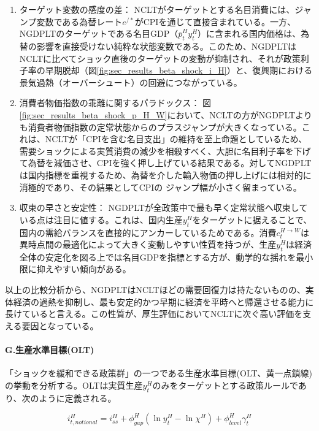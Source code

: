 \begin{enumerate}
    \item\label{itm:sec_results_beta_shock_analysis_ngdplt_sensitivity} ターゲット変数の感度の差：
    NCLTがターゲットとする名目消費には、ジャンプ変数である為替レート\(e^{/*}\)がCPIを通じて直接含まれている。一方、NGDPLTのターゲットである名目GDP（\(\bar{p}_t^Hy_t^H\)）に含まれる国内価格は、為替の影響を直接受けない純粋な状態変数である。このため、NGDPLTはNCLTに比べてショック直後のターゲットの変動が抑制され、それが政策利子率の早期脱却（図\ref{fig:sec_results_beta_shock_i_H}）と、復興期における景気過熱（オーバーシュート）の回避につながっている。
    \item\label{itm:sec_results_beta_shock_analysis_ngdplt_cpi} 消費者物価指数の乖離に関するパラドックス：
    図\ref{fig:sec_results_beta_shock_p_H_W}において、NCLTの方がNGDPLTよりも消費者物価指数の定常状態からのプラスジャンプが大きくなっている。これは、NCLTが「CPIを含む名目支出」の維持を至上命題としているため、需要ショックによる実質消費の減少を相殺すべく、大胆に名目利子率を下げて為替を減価させ、CPIを強く押し上げている結果である。対してNGDPLTは国内指標を重視するため、為替を介した輸入物価の押し上げには相対的に消極的であり、その結果としてCPIの ジャンプ幅が小さく留まっている。
    \item\label{itm:sec_results_beta_shock_analysis_ngdplt_convergence} 収束の早さと安定性：
    NGDPLTが全政策中で最も早く定常状態へ収束している点は注目に値する。これは、国内生産\(y_t^H\)をターゲットに据えることで、国内の需給バランスを直接的にアンカーしているためである。消費\(c_t^{H\to W}\)は異時点間の最適化によって大きく変動しやすい性質を持つが、生産\(y_t^H\)は経済全体の安定化を図る上では名目GDPを指標とする方が、動学的な揺れを最小限に抑えやすい傾向がある。
\end{enumerate}

以上の比較分析から、NGDPLTはNCLTほどの需要回復力は持たないものの、実体経済の過熱を抑制し、最も安定的かつ早期に経済を平時へと帰還させる能力に長けていると言える。この性質が、厚生評価においてNCLTに次ぐ高い評価を支える要因となっている。

\paragraph{G.生産水準目標(OLT)}\label{sec:sec_results_beta_shock_analysis_olt}
「ショックを緩和できる政策群」の一つである生産水準目標(OLT、黄一点鎖線)の挙動を分析する。OLTは実質生産\(y_t^H\)のみをターゲットとする政策ルールであり、次のように定義される。

\begin{equation}
i_{t,notional}^H=i_{ss}^H+\phi_{gap}^H(\ln y_t^H-\ln\chi^H)+\phi_{level}^H\gamma_t^H
\label{form:sec_results_beta_shock_analysis_olt_policy}
\end{equation}

